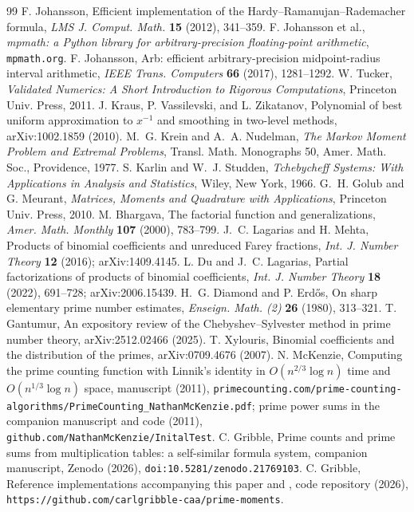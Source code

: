 \documentclass[11pt]{article}
\theoremstyle{remark}
\begin{document}
\begin{thebibliography}{99}
 F. Johansson, Efficient implementation of the Hardy--Ramanujan--Rademacher
formula, \emph{LMS J. Comput. Math.} \textbf{15} (2012), 341--359.
 F. Johansson et al., \emph{mpmath: a Python library for arbitrary-precision
floating-point arithmetic}, \texttt{mpmath.org}.
 F. Johansson, Arb: efficient arbitrary-precision midpoint-radius interval arithmetic,
\emph{IEEE Trans. Computers} \textbf{66} (2017), 1281--1292.
 W. Tucker, \emph{Validated Numerics: A Short Introduction to Rigorous
Computations}, Princeton Univ. Press, 2011.
 J. Kraus, P. Vassilevski, and L. Zikatanov, Polynomial of best uniform approximation to
$x^{-1}$ and smoothing in two-level methods, arXiv:1002.1859 (2010).
 M.~G. Krein and A.~A. Nudelman, \emph{The Markov Moment Problem and Extremal Problems},
Transl. Math. Monographs 50, Amer. Math. Soc., Providence, 1977.
 S. Karlin and W.~J. Studden, \emph{Tchebycheff Systems: With Applications in Analysis
and Statistics}, Wiley, New York, 1966.
 G.~H. Golub and G. Meurant, \emph{Matrices, Moments and Quadrature with Applications},
Princeton Univ. Press, 2010.
 M. Bhargava, The factorial function and generalizations, \emph{Amer. Math.
Monthly} \textbf{107} (2000), 783--799.
 J.~C. Lagarias and H. Mehta, Products of binomial coefficients and unreduced Farey
fractions, \emph{Int. J. Number Theory} \textbf{12} (2016); arXiv:1409.4145.
 L. Du and J.~C. Lagarias, Partial factorizations of products of binomial coefficients,
\emph{Int. J. Number Theory} \textbf{18} (2022), 691--728; arXiv:2006.15439.
 H.~G. Diamond and P. Erd\H{o}s, On sharp elementary prime number estimates,
\emph{Enseign. Math. (2)} \textbf{26} (1980), 313--321.
 T. Gantumur, An expository review of the Chebyshev--Sylvester method in prime
number theory, arXiv:2512.02466 (2025).
 T. Xylouris, Binomial coefficients and the distribution of the primes,
arXiv:0709.4676 (2007).
 N. McKenzie, Computing the prime counting function with Linnik's identity in
$O(n^{2/3} \log n)$ time and $O(n^{1/3} \log n)$ space, manuscript (2011),
\texttt{primecounting.com/prime-counting-algorithms/}\allowbreak\texttt{PrimeCounting\_NathanMcKenzie.pdf}; prime power
sums in the companion manuscript and code (2011), \texttt{github.com/NathanMcKenzie/InitalTest}.
 C. Gribble, Prime counts and prime sums from multiplication tables: a
self-similar formula system, companion manuscript, Zenodo (2026), \texttt{doi:10.5281/zenodo.21769103}.
 C. Gribble, Reference implementations accompanying this paper and \cite{Companion},
code repository (2026), \texttt{https://github.com/carlgribble-caa/prime-moments}.
\end{thebibliography}
\end{document}

